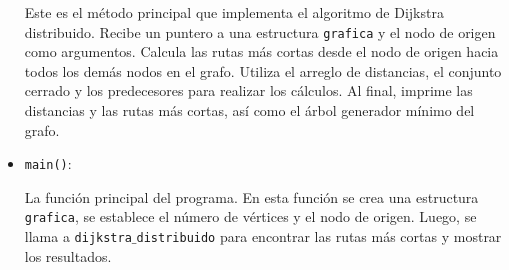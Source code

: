 \documentclass[a4paper,12pt]{article}
\begin{document}
\begin{itemize}
    Este es el método principal que implementa el algoritmo de Dijkstra distribuido. Recibe un puntero a una estructura \texttt{grafica} y el nodo de origen como argumentos. Calcula las rutas más cortas desde el nodo de origen hacia todos los demás nodos en el grafo. Utiliza el arreglo de distancias, el conjunto cerrado y los predecesores para realizar los cálculos. Al final, imprime las distancias y las rutas más cortas, así como el árbol generador mínimo del grafo.

    \item \texttt{main()}: 
    
    La función principal del programa. En esta función se crea una estructura \texttt{grafica}, se establece el número de vértices y el nodo de origen. Luego, se llama a \texttt{dijkstra$\_$distribuido} para encontrar las rutas más cortas y mostrar los resultados.
\end{itemize}
\end{document}
